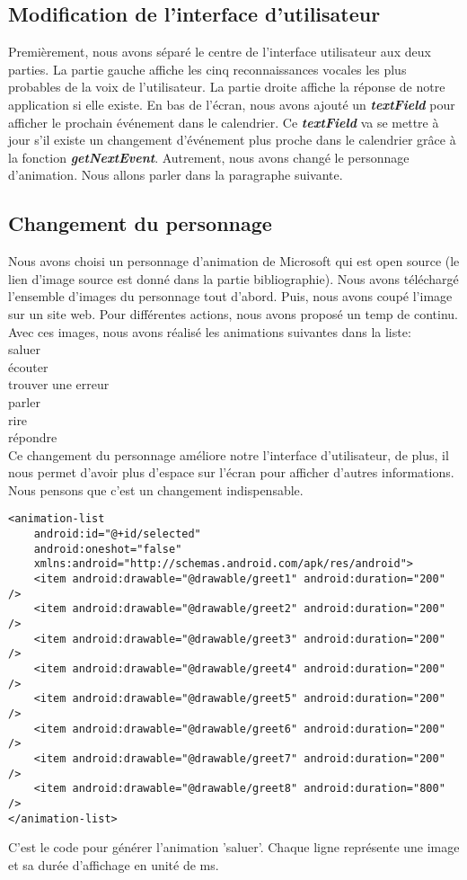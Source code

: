 \subsection{Modification de l'interface d'utilisateur}
\indent Premièrement, nous avons séparé le centre de l'interface utilisateur aux deux parties. La partie gauche affiche les cinq reconnaissances vocales les plus probables de la voix de l'utilisateur. La partie droite affiche la réponse de notre application si elle existe. En bas de l'écran, nous avons ajouté un \textbf{\emph{textField}} pour afficher le prochain événement dans le calendrier. Ce \textbf{\emph{textField}} va se mettre à jour s'il existe un changement d'événement plus proche dans le calendrier grâce à la fonction \textbf{\emph{getNextEvent}}. Autrement, nous avons changé le personnage d'animation. Nous allons parler dans la paragraphe suivante.

\subsection{Changement du personnage}

\indent Nous avons choisi un personnage d'animation de Microsoft qui est open source (le lien d'image source est donné dans la partie bibliographie). Nous avons téléchargé l'ensemble d'images du personnage tout d'abord. Puis, nous avons coupé l'image sur un site web. Pour différentes actions, nous avons proposé un temp de continu. Avec ces images, nous avons réalisé les animations  suivantes dans la liste: \\
\indent saluer\\
\indent écouter\\
\indent trouver une  erreur\\
\indent parler\\
\indent rire\\
\indent répondre\\
\indent Ce changement du personnage améliore notre l'interface d'utilisateur, de plus, il nous permet d'avoir plus d'espace sur l'écran pour afficher d'autres informations. Nous pensons que c'est un changement indispensable.

\begin{lstlisting}[frame=none,aboveskip=0.5em]
<animation-list
    android:id="@+id/selected"
    android:oneshot="false"
    xmlns:android="http://schemas.android.com/apk/res/android">
    <item android:drawable="@drawable/greet1" android:duration="200" />
    <item android:drawable="@drawable/greet2" android:duration="200" />
    <item android:drawable="@drawable/greet3" android:duration="200" />
    <item android:drawable="@drawable/greet4" android:duration="200" />
    <item android:drawable="@drawable/greet5" android:duration="200" />
    <item android:drawable="@drawable/greet6" android:duration="200" />
    <item android:drawable="@drawable/greet7" android:duration="200" />
    <item android:drawable="@drawable/greet8" android:duration="800" />
</animation-list>
\end{lstlisting}

\indent C'est le code pour générer l'animation 'saluer'. Chaque ligne représente une image et sa durée d'affichage en unité de ms.
\newpage
